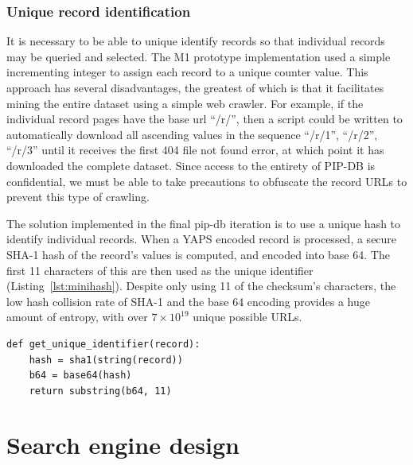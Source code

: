 \newpage

\subsubsection*{Unique record identification}

It is necessary to be able to unique identify records so that
individual records may be queried and selected. The M1 prototype
implementation used a simple incrementing integer to assign each
record to a unique counter value. This approach has several
disadvantages, the greatest of which is that it facilitates mining the
entire dataset using a simple web crawler. For example, if the
individual record pages have the base url ``/r/'', then a script could
be written to automatically download all ascending values in the
sequence ``/r/1'', ``/r/2'', ``/r/3'' until it receives the first 404
file not found error, at which point it has downloaded the complete
dataset. Since access to the entirety of PIP-DB is confidential, we
must be able to take precautions to obfuscate the record URLs to
prevent this type of crawling.

The solution implemented in the final pip-db iteration is to use a
unique hash to identify individual records. When a YAPS encoded record
is processed, a secure SHA-1 hash of the record's values is computed,
and encoded into base 64. The first 11 characters of this are then
used as the unique identifier (Listing~\ref{lst:minihash}). Despite
only using 11 of the checksum's characters, the low hash collision
rate of SHA-1 and the base 64 encoding provides a huge amount of
entropy, with over $7 \times 10^{19}$ unique possible URLs.\\

\lstset{language=python}
\begin{lstlisting}[label=lst:minihash,caption={%
      [Pseudocode for generating unique record identifiers]
       Pseudocode for generating unique record identifiers, See
       \texttt{util.clj} for the Clojure implementation.}]
def get_unique_identifier(record):
    hash = sha1(string(record))
    b64 = base64(hash)
    return substring(b64, 11)
\end{lstlisting}

\newpage

\section{Search engine design}\label{sec:search-engine}

